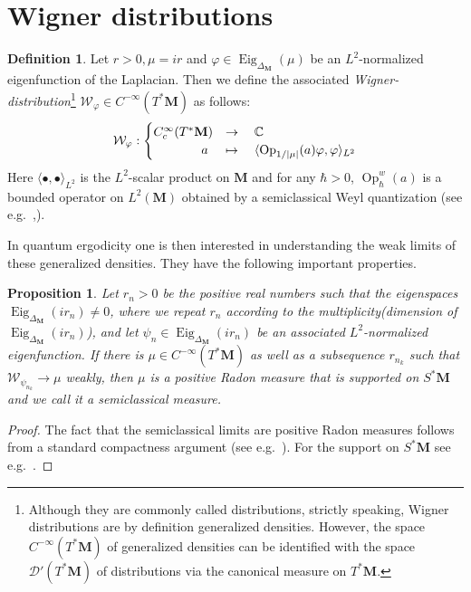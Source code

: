 \documentclass[10pt]{amsart}
\newtheorem{prop}[cdrthm]{Proposition}
\theoremstyle{definition}
\newtheorem{defi}[cdrthm]{Definition}
\DeclareMathOperator{\Eig}{Eig}
\DeclareMathOperator{\Op}{Op}
\newcommand{\cc}{\mathbb{C}}
\begin{document}
\appendix
\section{Wigner distributions}\label{app:wigner}
\begin{defi}\label{def:wigner}
Let $r>0, \mu=ir$ and $\varphi \in \Eig_{\Delta_{\mathbf M}} (\mu)$ be an $L^2$-normalized eigenfunction of the Laplacian. Then we define the associated \emph{Wigner-distribution}\footnote{Although they are commonly called distributions, strictly speaking, Wigner distributions are by definition generalized densities. However, the space $C^{-\infty}(T^*\mathbf M)$ of generalized densities can be identified with the space $\mathcal D'(T^*\mathbf M)$ of distributions via the canonical measure on $T^*\mathbf M$.} $\mathcal W_\varphi\in C^{-\infty}(T^*\mathbf M)$ as follows:
\[
\mathcal W_\varphi:
\begin{cases}
C_c^\infty (T^*\mathbf M) &\rightarrow\quad\cc\\
\mkern 68mu a &\mapsto \quad\langle \Op_{1/|\mu|} (a) \varphi, \varphi\rangle_{L^2}
\end{cases}
\]
Here $\langle\bullet,\bullet\rangle_{L^2}$ is the $L^2$-scalar product on $\mathbf M$ and for any $\hbar >0$, $\Op^w_\hbar (a)$ is a bounded operator on $L^2(\mathbf M)$ obtained by a semiclassical Weyl quantization (see e.g.~\cite{Zw12},\cite[Appendix~E]{DZ18}).
\end{defi}

In quantum ergodicity one is then interested in understanding the weak limits of these generalized densities. They have the following important properties.


\begin{prop}\label{prop:semiclassical_measures}
Let $r_n>0$ be the positive real numbers such that the eigenspaces $\Eig_{\Delta_{\mathbf M}} (ir_n)\neq 0$, where we repeat $r_n$ according to the multiplicity\linebreak (dimension of $\Eig_{\Delta_{\mathbf M}} (ir_n)$), and let $\psi_n\in \Eig_{\Delta_{\mathbf M}} (ir_n)$ be an associated $L^2$-normalized eigenfunction. If there is $\mu\in C^{-\infty}(T^*\mathbf M)$ as well as a subsequence $r_{n_k}$ such that $\mathcal W_{\psi_{n_k}}\to \mu$ weakly, then $\mu$ is a positive Radon measure that is supported on $S^*\mathbf M$ and we call it a
\emph{semiclassical measure}.
\end{prop}


\begin{proof}
The fact that the semiclassical limits are positive Radon measures follows from a standard compactness argument (see e.g.~\cite[Chapter~5]{Zw12}). For the support on $S^*\mathbf M$ see e.g.~\cite[Chapter~15]{Zw12}.
\end{proof}
\end{document}
